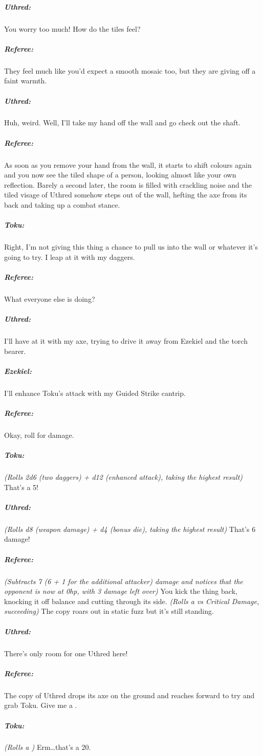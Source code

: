 \documentclass[itdr/core]{subfiles}
\begin{document}
{\subparagraph{Uthred:} You worry too much! How do the tiles feel?

\subparagraph{Referee:} They feel much like you'd expect a smooth mosaic too, but they are giving off a faint warmth.

\subparagraph{Uthred:} Huh, weird. Well, I'll take my hand off the wall and go check out the shaft.

\vfill
\break

\subparagraph{Referee:} As soon as you remove your hand from the wall, it starts to shift colours again and you now see the tiled shape of a person, looking almost like your own reflection. Barely a second later, the room is filled with crackling noise and the tiled visage of Uthred somehow steps out of the wall, hefting the axe from its back and taking up a combat stance.

\subparagraph{Toku:} Right, I'm not giving this thing a chance to pull us into the wall or whatever it's going to try. I leap at it with my daggers.

\subparagraph{Referee:} What everyone else is doing?

\subparagraph{Uthred:} I'll have at it with my axe, trying to drive it away from Ezekiel and the torch bearer.

\subparagraph{Ezekiel:} I'll enhance Toku's attack with my Guided Strike cantrip.

\subparagraph{Referee:} Okay, roll for damage.

\subparagraph{Toku:} {\em (Rolls 2d6 (two daggers) + d12 (enhanced attack), taking the highest result)} That's a 5!

\subparagraph{Uthred:} {\em (Rolls d8 (weapon damage) + d4 (bonus die), taking the highest result)} That's 6 damage!

\subparagraph{Referee:} {\em (Subtracts 7 (6 + 1 for the additional attacker) damage and notices that the opponent is now at 0hp, with 3 damage left over)} You kick the thing back, knocking it off balance and cutting through its side. {\em (Rolls a  vs Critical Damage, succeeding)} The copy roars out in static fuzz but it's still standing.

\subparagraph{Uthred:} There's only room for one Uthred here!

\subparagraph{Referee:} The copy of Uthred drops its axe on the ground and reaches forward to try and grab Toku. Give me a .

\subparagraph{Toku:} {\em (Rolls a )} Erm\ldots that's a 20.

}
\end{document}
